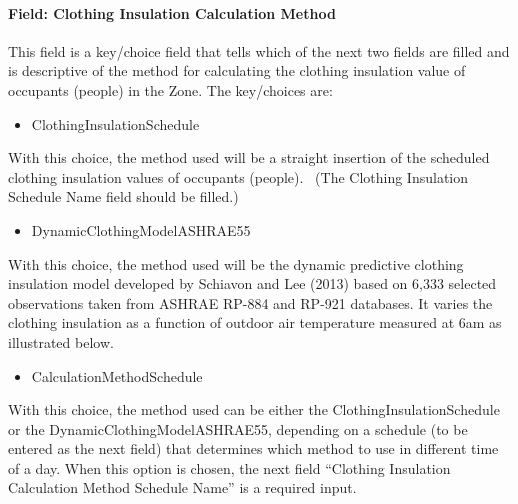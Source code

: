 \paragraph{Field: Clothing Insulation Calculation Method}\label{field-clothing-insulation-calculation-method}

This field is a key/choice field that tells which of the next two fields are filled and is descriptive of the method for calculating the clothing insulation value of occupants (people) in the Zone. The key/choices are:

\begin{itemize}
\tightlist
\item
  ClothingInsulationSchedule
\end{itemize}

With this choice, the method used will be a straight insertion of the scheduled clothing insulation values of occupants (people).~ (The Clothing Insulation Schedule Name field should be filled.)

\begin{itemize}
\tightlist
\item
  DynamicClothingModelASHRAE55
\end{itemize}

With this choice, the method used will be the dynamic predictive clothing insulation model developed by Schiavon and Lee (2013) based on 6,333 selected observations taken from ASHRAE RP-884 and RP-921 databases. It varies the clothing insulation as a function of outdoor air temperature measured at 6am as illustrated below.

\begin{itemize}
\tightlist
\item
  CalculationMethodSchedule
\end{itemize}

With this choice, the method used can be either the ClothingInsulationSchedule or the DynamicClothingModelASHRAE55, depending on a schedule (to be entered as the next field) that determines which method to use in different time of a day. When this option is chosen, the next field ``Clothing Insulation Calculation Method Schedule Name'' is a required input.

